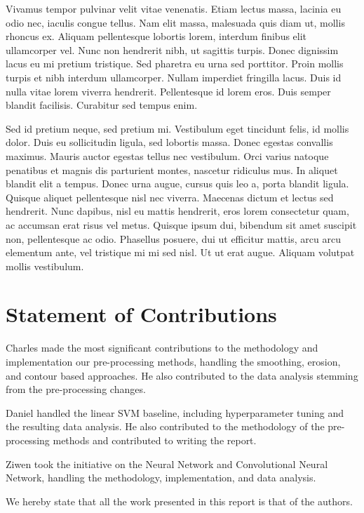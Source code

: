 \documentclass[conference]{IEEEtran}
\begin{document}
Vivamus tempor pulvinar velit vitae venenatis. Etiam lectus massa, lacinia eu odio nec, iaculis congue tellus. Nam elit massa, malesuada quis diam ut, mollis rhoncus ex. Aliquam pellentesque lobortis lorem, interdum finibus elit ullamcorper vel. Nunc non hendrerit nibh, ut sagittis turpis. Donec dignissim lacus eu mi pretium tristique. Sed pharetra eu urna sed porttitor. Proin mollis turpis et nibh interdum ullamcorper. Nullam imperdiet fringilla lacus. Duis id nulla vitae lorem viverra hendrerit. Pellentesque id lorem eros. Duis semper blandit facilisis. Curabitur sed tempus enim.

Sed id pretium neque, sed pretium mi. Vestibulum eget tincidunt felis, id mollis dolor. Duis eu sollicitudin ligula, sed lobortis massa. Donec egestas convallis maximus. Mauris auctor egestas tellus nec vestibulum. Orci varius natoque penatibus et magnis dis parturient montes, nascetur ridiculus mus. In aliquet blandit elit a tempus. Donec urna augue, cursus quis leo a, porta blandit ligula. Quisque aliquet pellentesque nisl nec viverra. Maecenas dictum et lectus sed hendrerit. Nunc dapibus, nisl eu mattis hendrerit, eros lorem consectetur quam, ac accumsan erat risus vel metus. Quisque ipsum dui, bibendum sit amet suscipit non, pellentesque ac odio. Phasellus posuere, dui ut efficitur mattis, arcu arcu elementum ante, vel tristique mi mi sed nisl. Ut ut erat augue. Aliquam volutpat mollis vestibulum. 

\section{Statement of Contributions}

Charles made the most significant contributions to the methodology and implementation our pre-processing methods, handling the smoothing, erosion, and contour based approaches. He also contributed to the data analysis stemming from the pre-processing changes.

Daniel handled the linear SVM baseline, including hyperparameter tuning and the resulting data analysis. He also contributed to the methodology of the pre-processing methods and contributed to writing the report.

Ziwen took the initiative on the Neural Network and Convolutional Neural Network, handling the methodology, implementation, and data analysis.

We hereby state that all the work presented in this report is that of the authors. 
\end{document}

